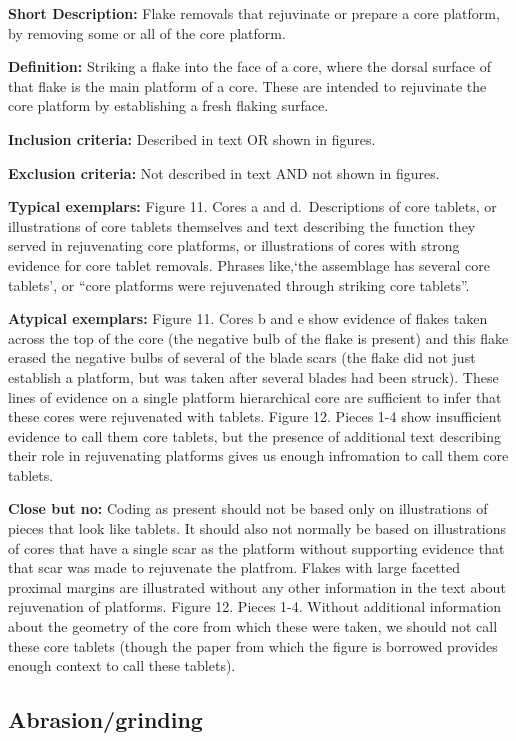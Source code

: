 \documentclass[
]{article}
\begin{document}
\textbf{Short Description:} Flake removals that rejuvinate or prepare a
core platform, by removing some or all of the core platform.

\textbf{Definition:} Striking a flake into the face of a core, where the
dorsal surface of that flake is the main platform of a core. These are
intended to rejuvinate the core platform by establishing a fresh flaking
surface.

\textbf{Inclusion criteria:} Described in text OR shown in figures.

\textbf{Exclusion criteria:} Not described in text AND not shown in
figures.

\textbf{Typical exemplars:} Figure 11. Cores a and d.~Descriptions of
core tablets, or illustrations of core tablets themselves and text
describing the function they served in rejuvenating core platforms, or
illustrations of cores with strong evidence for core tablet removals.
Phrases like,`the assemblage has several core tablets', or ``core
platforms were rejuvenated through striking core tablets''.

\textbf{Atypical exemplars:} Figure 11. Cores b and e show evidence of
flakes taken across the top of the core (the negative bulb of the flake
is present) and this flake erased the negative bulbs of several of the
blade scars (the flake did not just establish a platform, but was taken
after several blades had been struck). These lines of evidence on a
single platform hierarchical core are sufficient to infer that these
cores were rejuvenated with tablets. Figure 12. Pieces 1-4 show
insufficient evidence to call them core tablets, but the presence of
additional text describing their role in rejuvenating platforms gives us
enough infromation to call them core tablets.

\textbf{Close but no:} Coding as present should not be based only on
illustrations of pieces that look like tablets. It should also not
normally be based on illustrations of cores that have a single scar as
the platform without supporting evidence that that scar was made to
rejuvenate the platfrom. Flakes with large facetted proximal margins are
illustrated without any other information in the text about rejuvenation
of platforms. Figure 12. Pieces 1-4. Without additional information
about the geometry of the core from which these were taken, we should
not call these core tablets (though the paper from which the figure is
borrowed provides enough context to call these tablets).

\subsection{Abrasion/grinding}\label{abrasiongrinding}
\end{document}
